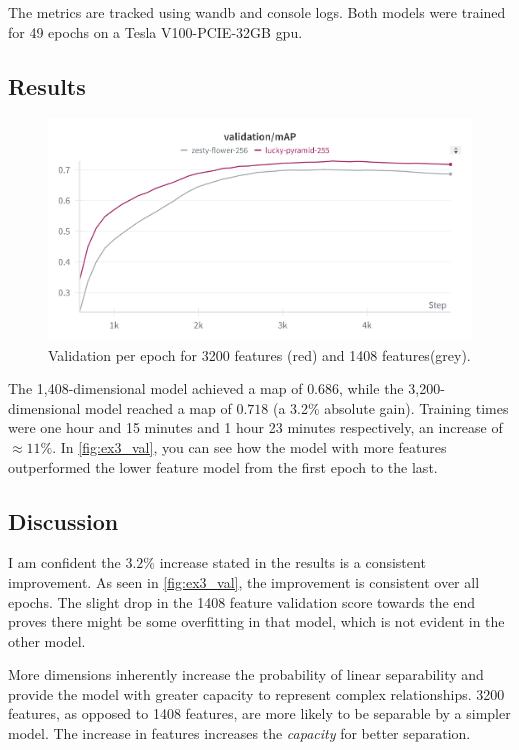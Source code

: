The metrics are tracked using \acrlong{wandb} and console logs.
Both models were trained for 49 epochs on a Tesla V100-PCIE-32GB \acrshort{gpu}.

\subsection{Results}
\label{ssec:ex3_results}

\begin{figure}
    \centering
    \includegraphics[width=0.75\linewidth]{figures/1408_3200_val.png}
    \caption{Validation per epoch for 3200 features (red) and 1408 features(grey). }
    \label{fig:ex3_val}
\end{figure}
The 1,408-dimensional model achieved a  \acrshort{map} of \(0.686\), while the 3,200-dimensional model reached a \acrshort{map} of \(0.718\) (a 3.2\% absolute gain). Training times were one hour and 15 minutes and 1 hour 23 minutes respectively, an increase of \(\approx11\%\). In \autoref{fig:ex3_val}, you can see how the model with more features outperformed the lower feature model from the first epoch to the last. 


\subsection{Discussion}
\label{ssec:ex3_discussion}

I am confident the $3.2\%$ increase stated in the results is a consistent improvement. As seen in \autoref{fig:ex3_val}, the improvement is consistent over all epochs. The slight drop in the 1408 feature validation score towards the end proves there might be some overfitting in that model, which is not evident in the other model. 

More dimensions inherently increase the probability of linear separability and provide the model with greater capacity to represent complex relationships. 3200 features, as opposed to 1408 features, are more likely to be separable by a simpler model. The increase in features increases the \textit{capacity} for better separation. 

